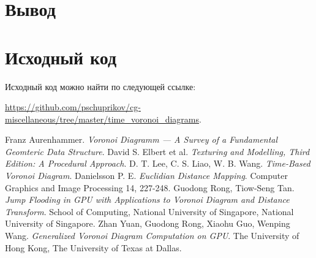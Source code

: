 \documentclass[12pt]{article}
\begin{document}
\section{Вывод}

\pagebreak

\section{Исходный код}
\label{source}
Исходный код можно найти по следующей ссылке: 

\url{https://github.com/pschuprikov/cg-miscellaneous/tree/master/time_voronoi_diagrams}.

\begin{thebibliography}{10}
 Franz Aurenhammer. \textit{Voronoi Diagramm --- A Survey of a Fundamental Geomteric Data Structure}.
 David S. Elbert et al. \textit{Texturing and Modelling, Third Edition: A Procedural Approach}.
 D. T. Lee, C. S. Liao, W. B. Wang. \textit{Time-Based Voronoi Diagram}.
 Danielsson P. E. \textit{Euclidian Distance Mapping}. Computer Graphics and Image Processing 14, 227-248.
 Guodong Rong, Tiow-Seng Tan. \textit{Jump Flooding in GPU with Applications to Voronoi Diagram and Distance Transform}. School of Computing, National University of Singapore, National University of Singapore. 
 Zhan Yuan, Guodong Rong, Xiaohu Guo, Wenping Wang. \textit{Generalized Voronoi Diagram Computation on GPU}. The University of Hong Kong, The University of Texas at Dallas.
\end{thebibliography}
\end{document}
